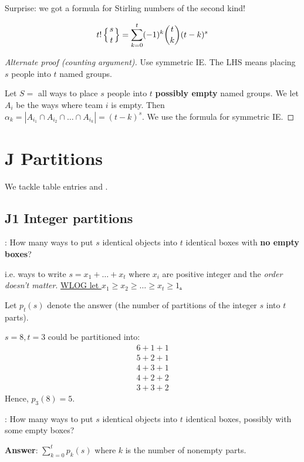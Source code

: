 \documentclass[12pt]{article}
\begin{document}
Surprise: we got a formula for Stirling numbers of the second kind!
\begin{proposition}
    \[t!\left\{{s \atop t}\right\} = \sum_{k=0}^{t}(-1)^k{t\choose k}(t-k)^s\]
\end{proposition}
\begin{proof}[Alternate proof (counting argument)]
    Use symmetric IE. The LHS means placing $s$ people into $t$ named groups.

    Let $S =$ all ways to place $s$ people into $t$ \textbf{possibly empty} named groups.  We let $A_i$ be the ways where team $i$ is empty.
    Then $\alpha_k=\left|A_{i_1}\cap A_{i_2}\cap \dots\cap A_{i_k}\right| = (t-k)^s$. We use the formula for symmetric IE. 
\end{proof}

\section{J Partitions}
We tackle table entries  and .

\subsection{J1 Integer partitions}
: How many ways to put $s$ identical objects into $t$ identical boxes with \textbf{no empty boxes}?

i.e. ways to write $s=x_1+\dots+x_t$ where $x_i$ are positive integer and the \textit{order doesn't matter}. \underline{WLOG let $x_1\geq x_2\geq \dots\geq x_t\geq 1$.}

Let $p_t(s)$ denote the answer (the number of partitions of the integer $s$ into $t$ parts). 

\eg $s=8, t=3$ could be partitioned into: \begin{align*}
    6+1+1\\
    5+2+1\\
    4+3+1\\
    4+2+2\\
    3+3+2
\end{align*}
Hence, $p_3(8)=5$.

: How many ways to put $s$ identical objects into $t$ identical boxes, possibly with some empty boxes?

\textbf{Answer}: $\displaystyle \sum_{k=0}^{t}p_k(s)$ where $k$ is the number of nonempty parts.
\end{document}
